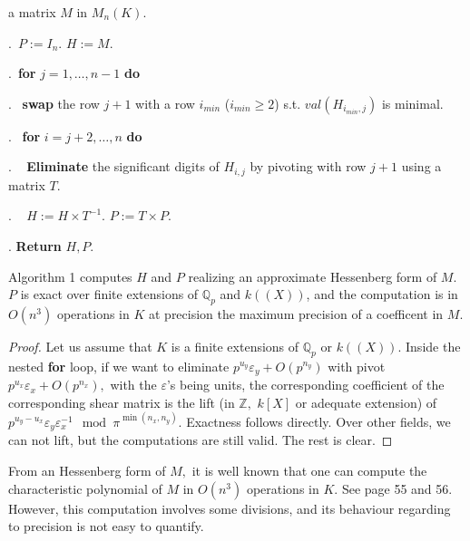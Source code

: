 \documentclass{sig-alternate-05-2015}
\begin{document}
 a matrix $M$ in $M_n(K).$

\smallskip

.\ $P:=I_n.$ \: $H:=M.$


.\ {\bf for} $j=1,\dots,n-1$ {\bf do} 

.\  \:  {\bf swap} the row $j+1$ with a row $i_{min}$ ($i_{min} \geq 2$) s.t. $val(H_{i_{min},j})$ is minimal. 

.\  \:  {\bf for} $i=j+2,\dots,n$ {\bf do} 

. \ \: \:  \textbf{Eliminate} the significant digits of $H_{i,j}$ by pivoting with row $j+1$ 
using a matrix $T.$

. \ \: \:  $H:=H \times T^{-1}.$ \: $P:=T \times P.$

. \textbf{Return} $H,P.$

\vspace{-1ex}\noindent\hrulefill

\medskip



\begin{prop} 
Algorithm 1 computes $H$ and $P$ realizing an approximate Hessenberg form of $M.$
$P$ is exact over finite extensions of $\mathbb{Q}_p$ and $k((X))$, and the computation is in $O(n^3)$ operations in $K$ at precision the maximum precision of a coefficent in $M.$
\end{prop}
\begin{proof}
Let us assume that $K$ is a finite extensions of $\mathbb{Q}_p$ or $k((X)).$
Inside the nested \textbf{for} loop, if we want to eliminate $p^{u_y} \varepsilon_y+O(p^{n_y})$ with pivot $p^{u_x} \varepsilon_x+O(p^{n_x}),$
with the $\varepsilon$'s being units,
the corresponding coefficient of the corresponding shear matrix is the lift (in $\mathbb{Z}, $  $k[X]$ or adequate extension) of $p^{u_y-u_x} \varepsilon_y \varepsilon_x^{-1} \mod \pi^{\min (n_x,n_y)}.$
Exactness follows directly. Over other fields, we can not lift, but the computations are still valid.
The rest is clear.
\end{proof}

\begin{rem} \label{rem:char_pol_from_hessenberg}
From an Hessenberg form of $M,$ it is well known
that one can compute the characteristic polynomial of 
$M$ in $O(n^3)$ operations in $K.$ See \cite{Cohen:2013} page
55 and 56.
However, this computation involves some divisions, and its
behaviour regarding to precision is not easy to
quantify.
\end{rem}
\end{document}
